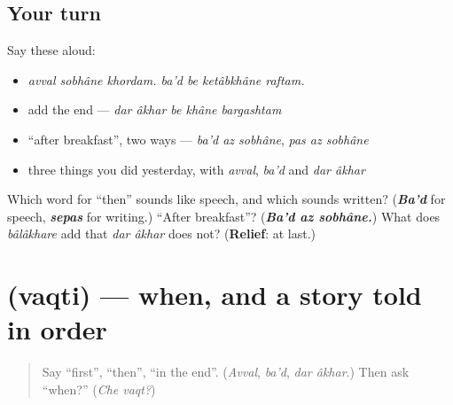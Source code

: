 \subsection*{Your turn}
Say these aloud:

\begin{itemize}
\raggedright
  \item \emph{avval sobhâne khordam. ba'd be ketâbkhâne raftam.}
  \item add the end — \emph{dar âkhar be khâne bargashtam}
  \item \textquotedblleft{}after breakfast\textquotedblright{}, two ways — \emph{ba'd az sobhâne}, \emph{pas az sobhâne}
  \item three things you did yesterday, with \emph{avval}, \emph{ba'd} and \emph{dar âkhar}
\end{itemize}

\begin{tcolorbox}[breakable,colback=teal!4,colframe=teal!35!black,title={Before you move on}]
Which word for \textquotedblleft{}then\textquotedblright{} sounds like speech, and which sounds written? (\emph{\textbf{Ba'd}} for speech, \emph{\textbf{sepas}} for writing.) \textquotedblleft{}After breakfast\textquotedblright{}? (\emph{\textbf{Ba'd az sobhâne.}}) What does \emph{bâlâkhare} add that \emph{dar âkhar} does not? (\textbf{Relief}: at last.)
\end{tcolorbox}
\section[\texorpdfstring{\fa{وقتی} (vaqti)}{وقتی (vaqti)}]{ (vaqti) — when, and a story told in order}

\label{lesson:FA-C291-vaqti}



\begin{quote}
Say \textquotedblleft{}first\textquotedblright{}, \textquotedblleft{}then\textquotedblright{}, \textquotedblleft{}in the end\textquotedblright{}. (\emph{Avval}, \emph{ba'd}, \emph{dar âkhar}.) Then ask \textquotedblleft{}when?\textquotedblright{} (\emph{Che vaqt?})
\end{quote}

